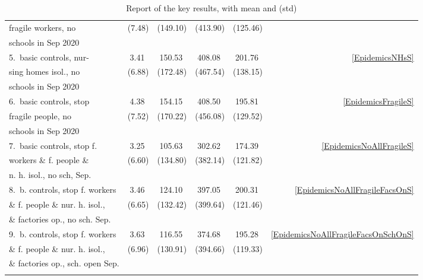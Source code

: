 \documentclass[graybox]{svmult}
\begin{document}
\begin{table}[t]
\begin{tabular}{lrrrrr}
 fragile workers, no          &      (7.48)         &   (149.10)  &     (413.90)         &   (125.46) \\
 schools in Sep 2020   \\
\hline\noalign{\smallskip}
5.~basic controls, nur-          &       3.41~      &  150.53~     &     408.08~         &  201.76~     & \ref{EpidemicsNHsS} \\
 sing homes isol., no         &       (6.88)     &   (172.48)    &     (467.54)         &  (138.15) \\
 schools in Sep 2020   \\
\hline\noalign{\smallskip}
6.~basic controls, stop          &       4.38~      &   154.15~    &     408.50~         &  195.81~     & \ref{EpidemicsFragileS} \\
 fragile people, no            &       (7.52)      &   (170.22)    &      (456.08)        &  (129.52) \\
 schools in Sep 2020   \\
\hline\noalign{\smallskip}
7.~basic controls, stop f.       &       3.25~      &   105.63~    &     302.62~          &  174.39~     & \ref{EpidemicsNoAllFragileS} \\
 workers \&  f. people \&   &       (6.60)      &   (134.80)   &     (382.14)          &  (121.82) \\
 n. h. isol., no sch, Sep.        \\
 \hline\noalign{\smallskip}
8.~b. controls, stop f. workers  &     3.46~     &  124.10~    &    397.05~           &  200.31~     & \ref{EpidemicsNoAllFragileFacsOnS} \\
 \&  f. people \& nur. h. isol.,  &  (6.65)       &  (132.42)   &    (399.64)           &  (121.46) \\
 \& factories op., no sch. Sep. \\
\hline\noalign{\smallskip}
9.~b. controls, stop f. workers  &     3.63~     &  116.55~   &    374.68~           &  195.28~     & \ref{EpidemicsNoAllFragileFacsOnSchOnS} \\
 \&  f. people \& nur. h. isol.,  &   (6.96)      &  (130.91) &     (394.66)           &  (119.33) \\
 \& factories op., sch. open Sep. \\
\hline\noalign{\smallskip}
\end{tabular}

\caption{Report of the key results, with mean and (std)}
\label{keyResultsT}
\end{table}
\end{document}
